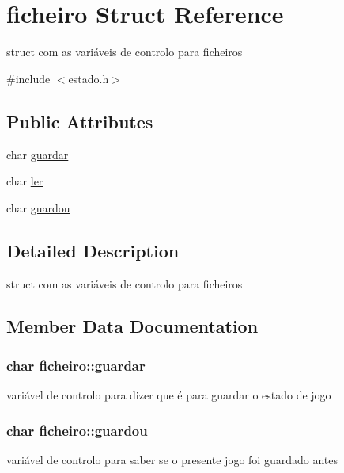 \hypertarget{structficheiro}{}\section{ficheiro Struct Reference}
\label{structficheiro}


struct com as variáveis de controlo para ficheiros  




{\ttfamily \#include $<$estado.\+h$>$}

\subsection*{Public Attributes}
\begin{DoxyCompactItemize}
\item 
char \hyperlink{structficheiro_ad1d6dc68ad2a3ccd1e622f13ab02439d}{guardar}
\item 
char \hyperlink{structficheiro_a6103c88bea7da15963a15e45823cc309}{ler}
\item 
char \hyperlink{structficheiro_ab803a345dd1d730c445c8ac7a06b2441}{guardou}
\end{DoxyCompactItemize}


\subsection{Detailed Description}
struct com as variáveis de controlo para ficheiros 

\subsection{Member Data Documentation}
\subsubsection[{\texorpdfstring{guardar}{guardar}}]{\setlength{\rightskip}{0pt plus 5cm}char ficheiro\+::guardar}\hypertarget{structficheiro_ad1d6dc68ad2a3ccd1e622f13ab02439d}{}\label{structficheiro_ad1d6dc68ad2a3ccd1e622f13ab02439d}
variável de controlo para dizer que é para guardar o estado de jogo 
\subsubsection[{\texorpdfstring{guardou}{guardou}}]{\setlength{\rightskip}{0pt plus 5cm}char ficheiro\+::guardou}\hypertarget{structficheiro_ab803a345dd1d730c445c8ac7a06b2441}{}\label{structficheiro_ab803a345dd1d730c445c8ac7a06b2441}
variável de controlo para saber se o presente jogo foi guardado antes 
